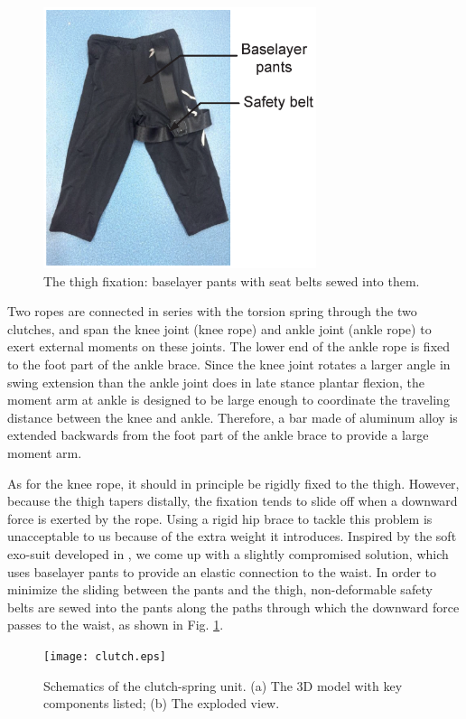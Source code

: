 \documentclass[twocolumn,cleanfoot,10pt]{asme2ej}
\begin{document}
\begin{figure}[b]
	\centering
	\includegraphics[width=8cm]{Figure3.eps}
	\caption{The thigh fixation: baselayer pants with seat belts sewed into them.}
	\label{fig:pants}   
\end{figure}

Two ropes are connected in series with the torsion spring through the two clutches, and span the knee joint (knee rope) and ankle joint (ankle rope) to exert external moments on these joints.
The lower end of the ankle rope is fixed to the foot part of the ankle brace.
Since the knee joint rotates a larger angle in swing extension than the ankle joint does in late stance plantar flexion, the moment arm at ankle is designed to be large enough to coordinate the traveling distance between the knee and ankle.
Therefore, a bar made of aluminum alloy is extended backwards from the foot part of the ankle brace to provide a large moment arm.

As for the knee rope, it should in principle be rigidly fixed to the thigh.
However, because the thigh tapers distally, the fixation tends to slide off when a downward force is exerted by the rope.
Using a rigid hip brace to tackle this problem is unacceptable to us because of the extra weight it introduces.
Inspired by the soft exo-suit developed in \cite{RN20}, we come up with a slightly compromised solution, which uses baselayer pants to provide an elastic connection to the waist.
In order to minimize the sliding between the pants and the thigh, non-deformable safety belts are sewed into the pants along the paths through which the downward force passes to the waist, as shown in Fig. \ref{fig:pants}.

\begin{figure}[t]
	\centering
	\texttt{[image: clutch.eps]}
	\caption{Schematics of the clutch-spring unit. (a) The 3D model with key components listed; (b) The exploded view.}
	\label{fig:clutch}   
\end{figure}
\end{document}
